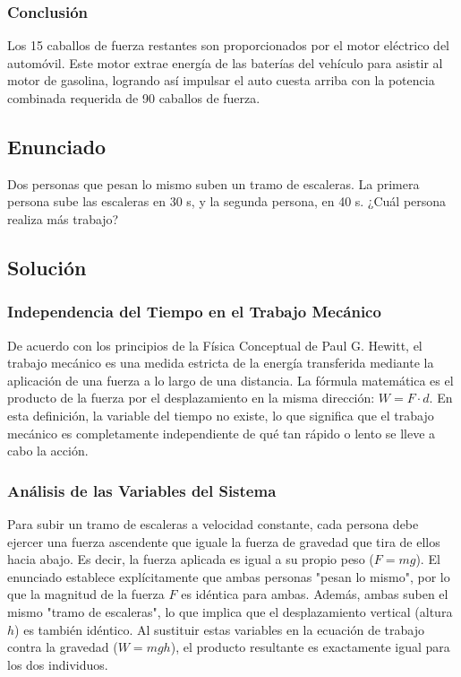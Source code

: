 \documentclass[a4paper,12pt]{article}
\begin{document}
\subsubsection*{Conclusión}
Los 15 caballos de fuerza restantes son proporcionados por el motor eléctrico del automóvil. Este motor extrae energía de las baterías del vehículo para asistir al motor de gasolina, logrando así impulsar el auto cuesta arriba con la potencia combinada requerida de 90 caballos de fuerza.

\newpage

\subsection*{Enunciado}
Dos personas que pesan lo mismo suben un tramo de escaleras. La primera persona sube las escaleras en 30 s, y la segunda persona, en 40 s. 
¿Cuál persona realiza más trabajo?

\subsection*{Solución}

\subsubsection*{Independencia del Tiempo en el Trabajo Mecánico}
De acuerdo con los principios de la Física Conceptual de Paul G. Hewitt, el trabajo mecánico es una medida estricta de la energía transferida mediante la aplicación de una fuerza a lo largo de una distancia. La fórmula matemática es el producto de la fuerza por el desplazamiento en la misma dirección: $W = F \cdot d$. En esta definición, la variable del tiempo no existe, lo que significa que el trabajo mecánico es completamente independiente de qué tan rápido o lento se lleve a cabo la acción.

\subsubsection*{Análisis de las Variables del Sistema}
Para subir un tramo de escaleras a velocidad constante, cada persona debe ejercer una fuerza ascendente que iguale la fuerza de gravedad que tira de ellos hacia abajo. Es decir, la fuerza aplicada es igual a su propio peso ($F = mg$). 
El enunciado establece explícitamente que ambas personas "pesan lo mismo", por lo que la magnitud de la fuerza $F$ es idéntica para ambas. Además, ambas suben el mismo "tramo de escaleras", lo que implica que el desplazamiento vertical (altura $h$) es también idéntico.
Al sustituir estas variables en la ecuación de trabajo contra la gravedad ($W = mgh$), el producto resultante es exactamente igual para los dos individuos.
\end{document}
